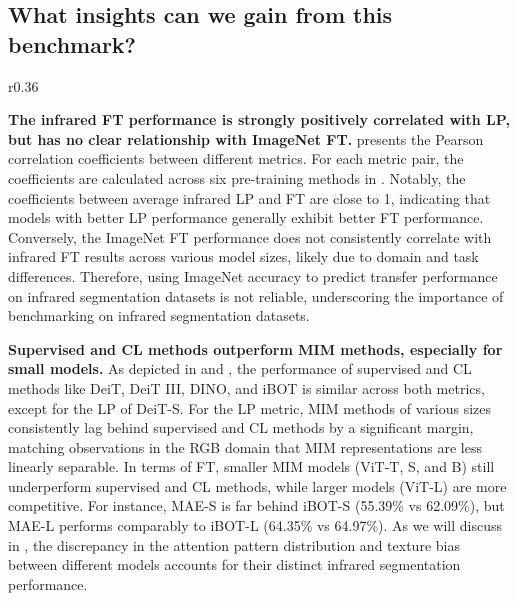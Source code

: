 \subsection{What insights can we gain from this benchmark?}
\label{sec:benchmark_multi_layer}

\begin{wraptable}{r}{0.36\textwidth}
    \vspace{-7.5mm}
    \caption{Pearson coefficients between average FT and other metrics.}
    \label{tab:correlation_coeff}
    \vspace{1mm}
    \centering
    \scriptsize
    \vspace{-4mm}
\end{wraptable}

\textbf{The infrared FT performance is strongly positively correlated with LP, but has no clear relationship with ImageNet FT.}  presents the Pearson \citep{pearson} correlation coefficients between different metrics. For each metric pair, the coefficients are calculated across six pre-training methods in . Notably, the coefficients between average infrared LP and FT are close to 1, indicating that models with better LP performance generally exhibit better FT performance. Conversely, the ImageNet FT performance does not consistently correlate with infrared FT results across various model sizes, likely due to domain and task differences. Therefore, using ImageNet accuracy to predict transfer performance on infrared segmentation datasets is not reliable, underscoring the importance of benchmarking on infrared segmentation datasets.

\textbf{Supervised and CL methods outperform MIM methods, especially for small models.} As depicted in  and , the performance of supervised and CL methods like DeiT, DeiT III, DINO, and iBOT is similar across both metrics, except for the LP of DeiT-S. For the LP metric, MIM methods of various sizes consistently lag behind supervised and CL methods by a significant margin, matching observations in the RGB domain \citep{mae} that MIM representations are less linearly separable. In terms of FT, smaller MIM models (ViT-T, S, and B) still underperform supervised and CL methods, while larger models (ViT-L) are more competitive. For instance, MAE-S is far behind iBOT-S (55.39\% vs 62.09\%), but MAE-L performs comparably to iBOT-L (64.35\% vs 64.97\%). As we will discuss in , the discrepancy in the attention pattern distribution and texture bias between different models accounts for their distinct infrared segmentation performance.

